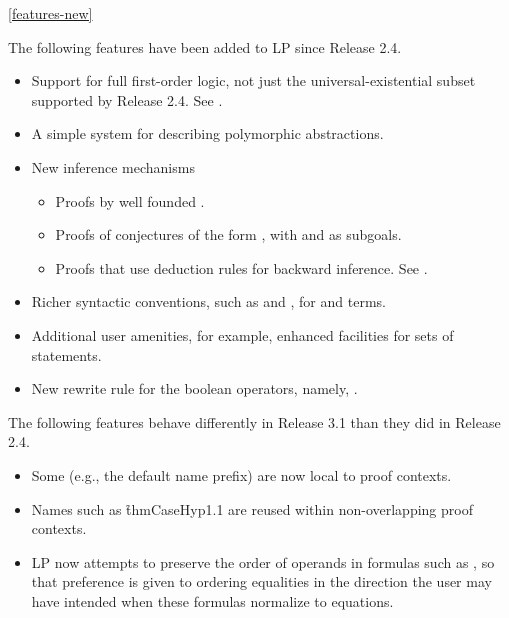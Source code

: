 \ref{features-new}

The following features have been added to LP since Release 2.4.
\begin{itemize}
\item
Support for full first-order logic, not just the universal-existential subset
supported by Release 2.4.  See .
\p
\item
A simple  system for describing polymorphic abstractions.
\p
\item
New inference mechanisms
\begin{itemize}
\item
Proofs by well founded .
\item
Proofs of conjectures of the form , with 
and  as subgoals.
\item
Proofs that use deduction rules for backward inference.  See .
\end{itemize}
\p
\item
Richer syntactic conventions, such as  and , for 
 and terms.
\p
\item
Additional user amenities, for example, enhanced facilities for
 sets of statements.
\p
\item
New rewrite rule for the boolean operators, namely, .
\end{itemize}

The following features behave differently in Release 3.1 than they did in
Release 2.4.

\begin{itemize}
\item
Some  (e.g., the default name prefix) are
now local to proof contexts.
\p
\item
Names such as \f{thmCaseHyp1.1} are reused within non-overlapping proof
contexts.
\p
\item
LP now attempts to preserve the order of operands in formulas such as 
, so that preference is given to ordering equalities in the 
direction the user may have intended when these formulas normalize to
equations.
\end{itemize}

